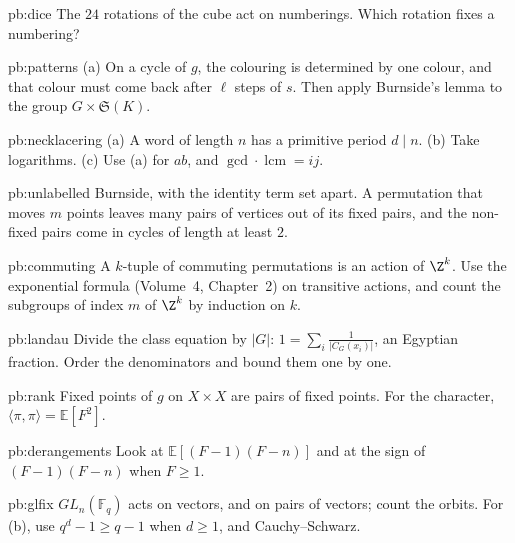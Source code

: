 \begin{hint}{pb:dice}
The $24$ rotations of the cube act on numberings. Which rotation fixes a numbering?
\end{hint}

\begin{hint}{pb:patterns}
(a) On a cycle of $g$, the colouring is determined by one colour, and that colour must come back after $\ell$ steps of $s$.
Then apply Burnside's lemma to the group $G\times\mathfrak S(K)$.
\end{hint}

\begin{hint}{pb:necklacering}
(a) A word of length $n$ has a primitive period $d\mid n$. (b) Take logarithms. (c) Use (a) for $ab$, and $\gcd\cdot\operatorname{lcm}=ij$.
\end{hint}

\begin{hint}{pb:unlabelled}
Burnside, with the identity term set apart. A permutation that moves $m$ points leaves many pairs of vertices out of
its fixed pairs, and the non-fixed pairs come in cycles of length at least $2$.
\end{hint}

\begin{hint}{pb:commuting}
A $k$-tuple of commuting permutations is an action of $\Z^k$. Use the exponential formula (Volume~4, Chapter~2) on transitive
actions, and count the subgroups of index $m$ of $\Z^k$ by induction on $k$.
\end{hint}

\begin{hint}{pb:landau}
Divide the class equation by $|G|$: $1=\sum_i\frac1{|C_G(x_i)|}$, an Egyptian fraction. Order the denominators and bound
them one by one.
\end{hint}

\begin{hint}{pb:rank}
Fixed points of $g$ on $X\times X$ are pairs of fixed points. For the character, $\langle\pi,\pi\rangle=\mathbb E[F^2]$.
\end{hint}

\begin{hint}{pb:derangements}
Look at $\mathbb E[(F-1)(F-n)]$ and at the sign of $(F-1)(F-n)$ when $F\ge1$.
\end{hint}

\begin{hint}{pb:glfix}
$GL_n(\mathbb F_q)$ acts on vectors, and on pairs of vectors; count the orbits. For (b), use $q^d-1\ge q-1$ when $d\ge1$,
and Cauchy--Schwarz.
\end{hint}

